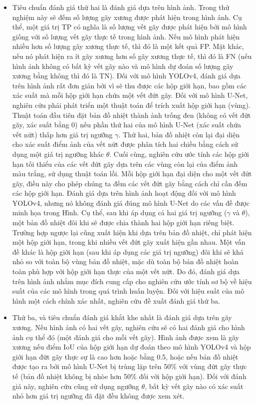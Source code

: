 \documentclass[../the.tex]{subfiles}
\begin{document}
{\begin{itemize}
		\item Tiêu chuẩn đánh giá thứ hai là đánh giá dựa trên hình ảnh. Trong thử nghiệm này sẽ đếm số lượng gãy xương được phát hiện trong hình ảnh. Cụ thể, một giá trị TP có nghĩa là số lượng vết gãy được phát hiện bởi mô hình giống với số lượng vết gãy thực tế trong hình ảnh. Nếu mô hình phát hiện nhiều hơn số lượng gãy xương thực tế, thì đó là một kết quả FP. Mặt khác, nếu nó phát hiện ra ít gãy xương hơn số gãy xương thực tế, thì đó là FN (nếu hình ảnh không có bất kỳ vết gãy nào và mô hình dự đoán số lượng gãy xương bằng không thì đó là TN). Đối với mô hình YOLOv4, đánh giá dựa trên hình ảnh rất đơn giản bởi vì sẽ thu được các hộp giới hạn, bao gồm các xác suất mà mỗi hộp giới hạn chứa một vết đứt gãy. Đối với mô hình U-Net, nghiên cứu phải phát triển một thuật toán để trích xuất hộp giới hạn (vùng). Thuật toán đầu tiên đặt bản đồ nhiệt thành ảnh trống đen (không có vết đứt gãy, xác suất bằng 0) nếu phần thứ hai của mô hình U-Net (xác suất chứa vết nứt) thấp hơn giá trị ngưỡng $\gamma$. Thứ hai, bản đồ nhiệt còn lại đại diện cho xác suất điểm ảnh của vết nứt được phân tích hai chiều bằng cách sử dụng một giá trị ngưỡng khác $\theta$. Cuối cùng, nghiên cứu ước tính các hộp giới hạn tối thiểu của các vết đứt gãy dựa trên các vùng còn lại của điểm ảnh màu trắng, sử dụng thuật toán lồi\cite{10.1145/235815.235821}. Mỗi hộp giới hạn đại diện cho một vết đứt gãy, điều này cho phép chúng ta đếm các vết đứt gãy bằng cách chỉ cần đếm các hộp giới hạn. Đánh giá dựa trên hình ảnh hoạt động đối với mô hình YOLOv4, nhưng nó không đánh giá đúng mô hình U-Net do các vấn đề được minh họa trong Hình. Cụ thể, sau khi áp dụng cả hai giá trị ngưỡng ($\gamma$ và $\theta$), một bản đồ nhiệt đôi khi sẽ được chia thành hai hộp giới hạn riêng biệt. Trường hợp ngược lại cũng xuất hiện khi dựa trên bản đồ nhiệt, chỉ phát hiện một hộp giới hạn, trong khi nhiều vết đứt gãy xuất hiện gần nhau. Một vấn đề khác là hộp giới hạn (sau khi áp dụng các giá trị ngưỡng) đôi khi sẽ khá nhỏ so với toàn bộ vùng bản đồ nhiệt, mặc dù toàn bộ bản đồ nhiệt hoàn toàn phù hợp với hộp giới hạn thực của một vết nứt. Do đó, đánh giá dựa trên hình ảnh nhằm mục đích cung cấp cho nghiên cứu ước tính sơ bộ về hiệu suất của các mô hình trong quá trình huấn luyện. Đối với hiệu suất của mô hình một cách chính xác nhất, nghiên cứu đề xuất đánh giá thứ ba.

		\item Thứ ba, và tiêu chuẩn đánh giá khắt khe nhất là đánh giá dựa trên gãy xương. Nếu hình ảnh có hai vết gãy, nghiên cứu sẽ có hai đánh giá cho hình ảnh cụ thể đó (một đánh giá cho mỗi vết gãy). Hình ảnh được xem là gãy xương nếu điểm IoU của hộp giới hạn dự đoán theo mô hình YOLOv4 và hộp giới hạn đứt gãy thực sự là cao hơn hoặc bằng 0.5, hoặc nếu bản đồ nhiệt được tạo ra bởi mô hình U-Net bị trùng lặp trên 50\% với vùng đứt gãy thực tế (bản đồ nhiệt không bị nhòe hơn 50\% đối với hộp giới hạn). Đối với đánh giá này, nghiên cứu cũng sử dụng ngưỡng $\theta$, bất kỳ vết gãy nào có xác suất nhỏ hơn giá trị ngưỡng đã đặt đều không được xem xét.


\end{itemize}}
\end{document}
